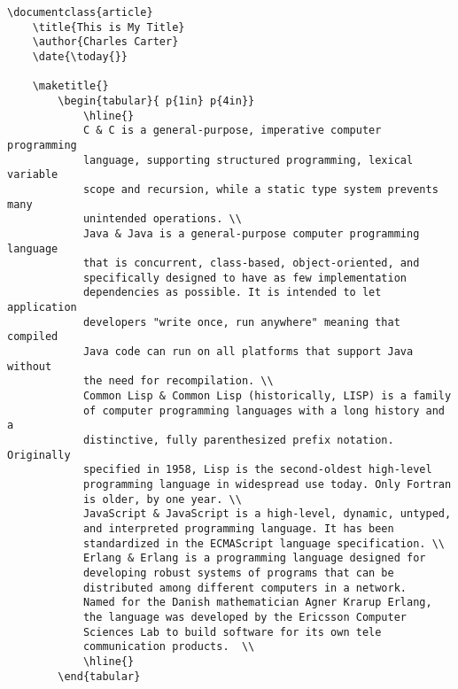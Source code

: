         \begin{verbatim}
\documentclass{article}
    \title{This is My Title}
    \author{Charles Carter}
    \date{\today{}}
 
    \maketitle{}
        \begin{tabular}{ p{1in} p{4in}}
            \hline{}
            C & C is a general-purpose, imperative computer programming 
            language, supporting structured programming, lexical variable 
            scope and recursion, while a static type system prevents many 
            unintended operations. \\
            Java & Java is a general-purpose computer programming language 
            that is concurrent, class-based, object-oriented, and 
            specifically designed to have as few implementation 
            dependencies as possible. It is intended to let application 
            developers "write once, run anywhere" meaning that compiled 
            Java code can run on all platforms that support Java without 
            the need for recompilation. \\
            Common Lisp & Common Lisp (historically, LISP) is a family 
            of computer programming languages with a long history and a 
            distinctive, fully parenthesized prefix notation. Originally 
            specified in 1958, Lisp is the second-oldest high-level 
            programming language in widespread use today. Only Fortran 
            is older, by one year. \\
            JavaScript & JavaScript is a high-level, dynamic, untyped, 
            and interpreted programming language. It has been 
            standardized in the ECMAScript language specification. \\
            Erlang & Erlang is a programming language designed for 
            developing robust systems of programs that can be 
            distributed among different computers in a network. 
            Named for the Danish mathematician Agner Krarup Erlang, 
            the language was developed by the Ericsson Computer 
            Sciences Lab to build software for its own tele
            communication products.  \\
            \hline{}
        \end{tabular}
    
        \end{verbatim}

